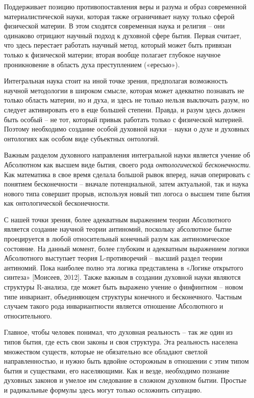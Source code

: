     Поддерживает позицию противопоставления веры и разума и образ современной материалистической науки, которая также ограничивает науку только сферой физической материи. В этом сходятся современная наука и религия – они одинаково отрицают научный подход к духовной сфере бытия. Первая считает, что здесь перестает работать научный метод, который может быть привязан только к физической материи; вторая вообще полагает глубокое научное проникновение в область духа преступлением («ересью»).

    Интегральная наука стоит на иной точке зрения, предполагая возможность научной методологии в широком смысле, которая может адекватно познавать не только область материи, но и духа, и здесь не только нельзя выключать разум, но следует активировать его в еще большей степени. Правда, и разум здесь должен быть особый – не тот, который привык работать только с физической материей. Поэтому необходимо создание особой духовной науки – науки о духе и духовных онтологиях как особом виде субъектных онтологий.

    Важным разделом духовного направления интегральной науки является учение об Абсолютном как высшем виде бытия, своего рода \textit{онтологической бесконечности}. Как математика в свое время сделала большой рывок вперед, начав оперировать с понятием бесконечности – вначале потенциальной, затем актуальной, так и наука нового типа совершит прорыв, используя новый тип логоса о высшем типе бытия как онтологической бесконечности.

    С нашей точки зрения, более адекватным выражением теории Абсолютного является создание научной теории антиномий, поскольку абсолютное бытие проецируется в любой относительный конечный разум как антиномическое состояние. На данный момент, более глубоким и адекватным выражением логики Абсолютного выступает теория L-противоречий – высший раздел теории антиномий. Пока наиболее полно эта логика представлена в «Логике открытого синтеза» [Моисеев, 2012]. Также важным в создании духовной науки являются структуры R-анализа, где может быть выражено учение о финфинтном – новом типе инвариант, объединяющем структуры конечного и бесконечного. Частным случаем такого рода инвариантности является отношение Абсолютного и относительного.

    Главное, чтобы человек понимал, что духовная реальность – так же один из типов бытия, где есть свои законы и своя структура. Эта реальность населена множеством существ, которые не обязательно все обладают светлой направленностью, и нужно быть вдвойне осторожным в отношении с этим типом бытия и существами, его населяющими. Как и везде, необходимо познание духовных законов и умелое им следование в сложном духовном бытии. Простые и радикальные формулы здесь могут только осложнить ситуацию.

